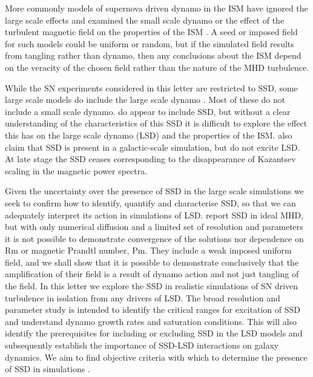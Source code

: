 \documentclass[preprint2]{aastex63}
\begin{document}
More commonly models of supernova driven dynamo in the ISM have ignored the 
large scale effects and examined the small scale dynamo or the effect of the
turbulent magnetic field on the properties of the ISM
\citep[e.g.,][]{BKMM04,BalKim05,MacLow:2005}.
A seed or imposed field for such models could be uniform or random, but if the
simulated field results from tangling rather than dynamo, then any conclusions
about the ISM depend on the veracity of the chosen field rather than the 
nature of the MHD turbulence.

While the SN experiments considered in this letter are restricted to SSD, some
large scale models do include the large scale dynamo
\citep[e.g.,][]{Gressel:2008,HWK09,WA09,Gent:2013b,EGSFB16,Pakmor17,SBADMN19,SDLMBP20,GE20}.
Most of these do not include a small scale dynamo.
\citet{Gent:2013b,EGSFB16} do appear to include SSD, but without a clear
understanding of the characteristics of this SSD it is difficult to explore the
effect this has on the large scale dynamo (LSD) and the properties of the ISM.
\citet{SBADMN19,SDLMBP20} also claim that SSD is present in a galactic-scale
simulation, but do not excite LSD. 
At late stage the SSD ceases corresponding to the disappearance of Kazantsev
scaling in the magnetic power spectra.

Given the uncertainty over the presence of SSD in the large scale simulations
we seek to confirm how to identify, quantify and characterise SSD, so that we
can adequately interpret its action in simulations of LSD.
\citet{BKMM04} report SSD in ideal MHD, but with only numerical diffusion and
a limited set of resolution and parameters it is not possible to demonstrate 
convergence of the solutions nor dependence on Rm or magnetic Prandtl number, Pm.
They include a weak imposed uniform field, and we shall show that it is possible
to demonstrate conclusively that the amplification of their field is a result of
dynamo action and not just tangling of the field.
%
In this letter we explore the SSD in realistic simulations of SN driven 
turbulence
in isolation from any drivers of LSD.
%
The broad resolution and parameter study is intended to identify the critical
ranges for excitation of SSD and understand dynamo growth rates and saturation 
conditions.
This will also identify the prerequisites for including or excluding SSD in the
LSD models and subsequently establish the importance of SSD-LSD interactions 
on galaxy dynamics. 
We aim to find objective criteria with which to determine the presence of SSD in 
simulations \citep[such as][]{Gent:2013b,GE20,SDLMBP20}.
\end{document}
